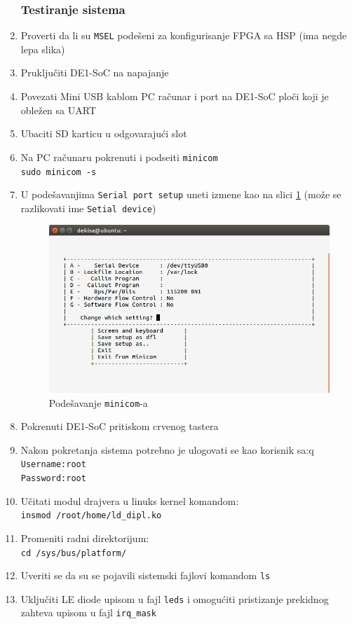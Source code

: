 \begin{enumerate}
\subsubsection{Testiranje sistema}
\item Proverti da li su \texttt{MSEL} podešeni za konfigurisanje FPGA sa HSP (ima negde lepa slika)
\item Pruključiti DE1-SoC na napajanje
\item Povezati Mini USB kablom PC računar i port na DE1-SoC ploči koji je obležen sa UART
\item Ubaciti SD karticu u odgovarajući slot
\item Na PC računaru pokrenuti i podseiti \texttt{minicom}\\
\texttt{sudo minicom -s}
\item U podešavanjima \texttt{Serial port setup} uneti izmene kao na slici \ref{slika:minicom} (može se razlikovati ime \texttt{Setial device})
\begin{figure}[h!]
\centering
\includegraphics[scale=0.6,trim={0 15 10 60},clip]{img/minicom.png}
\caption{Podešavanje \texttt{minicom}-a}
\label{slika:minicom}
\end{figure}
\item Pokrenuti DE1-SoC pritiskom crvenog tastera
\item Nakon pokretanja sistema potrebno je ulogovati se kao korisnik sa:q\\
\texttt{Username:root\\
Password:root}
\item Učitati modul drajvera u linuks kernel komandom:\\
\texttt{insmod /root/home/ld\_dipl.ko}
\item Promeniti radni direktorijum:\\
\texttt{cd /sys/bus/platform/}
\item Uveriti se da su se pojavili sistemski fajlovi komandom \texttt{ls}
\item Uključiti LE diode upisom u fajl \texttt{leds} i omogućiti pristizanje prekidnog zahteva upisom u fajl \texttt{irq\_mask}
\end{enumerate}
